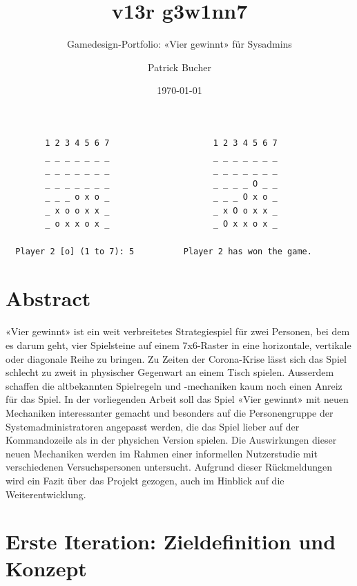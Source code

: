 \documentclass[a4paper,11pt,hidelinks]{scrartcl}
\begin{document}
\author{Patrick Bucher}
\title{v13r g3w1nn7}
\subtitle{Gamedesign-Portfolio: «Vier gewinnt» für Sysadmins}
\date{\today}
\maketitle
\thispagestyle{empty}

\begin{center}
    \begin{lstlisting}
        1 2 3 4 5 6 7                     1 2 3 4 5 6 7
        _ _ _ _ _ _ _                     _ _ _ _ _ _ _
        _ _ _ _ _ _ _                     _ _ _ _ _ _ _
        _ _ _ _ _ _ _                     _ _ _ _ O _ _
        _ _ _ o x o _                     _ _ _ O x o _
        _ x o o x x _                     _ x O o x x _
        _ o x x o x _                     _ O x x o x _

  Player 2 [o] (1 to 7): 5          Player 2 has won the game.
    \end{lstlisting}
\end{center}

\section*{Abstract}

«Vier gewinnt» ist ein weit verbreitetes Strategiespiel für zwei Personen, bei dem es darum geht, vier Spielsteine auf einem 7x6-Raster in eine horizontale, vertikale oder diagonale Reihe zu bringen. Zu Zeiten der Corona-Krise lässt sich das Spiel schlecht zu zweit in physischer Gegenwart an einem Tisch spielen. Ausserdem schaffen die altbekannten Spielregeln und -mechaniken kaum noch einen Anreiz für das Spiel. In der vorliegenden Arbeit soll das Spiel «Vier gewinnt» mit neuen Mechaniken interessanter gemacht und besonders auf die Personengruppe der Systemadministratoren angepasst werden, die das Spiel lieber auf der Kommandozeile als in der physichen Version spielen. Die Auswirkungen dieser neuen Mechaniken werden im Rahmen einer informellen Nutzerstudie mit verschiedenen Versuchspersonen untersucht. Aufgrund dieser Rückmeldungen wird ein Fazit über das Projekt gezogen, auch im Hinblick auf die Weiterentwicklung.
 
\newpage

\tableofcontents
\newpage

\section{Erste Iteration: Zieldefinition und Konzept}
\end{document}
